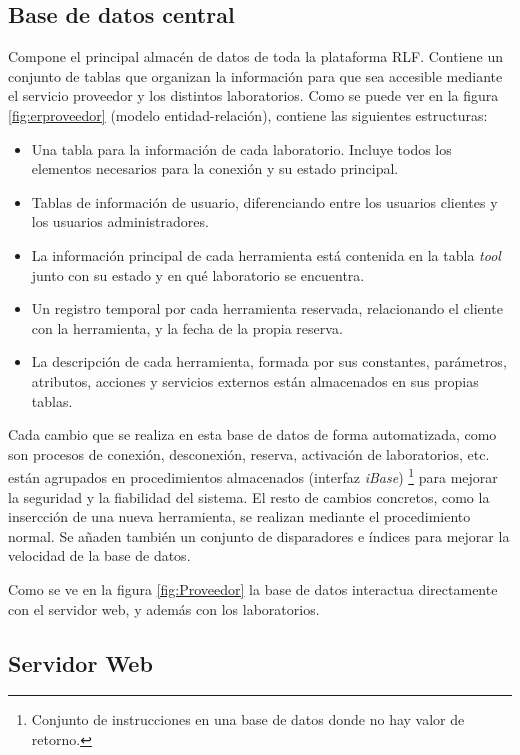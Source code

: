 
\subsection{Base de datos central}

Compone el principal almacén de datos de toda la plataforma RLF. 
Contiene un conjunto de tablas que organizan la información para que 
sea accesible mediante el servicio proveedor y los distintos 
laboratorios. Como se puede ver en la figura \ref{fig:erproveedor} 
(modelo entidad-relación), contiene las siguientes estructuras:

\begin{itemize}
\item Una tabla para la información de cada laboratorio. Incluye todos los 
elementos necesarios para la conexión y su estado principal.
\item Tablas de información de usuario, diferenciando entre los 
usuarios clientes y los usuarios administradores.
\item La información principal de cada herramienta está contenida en 
la tabla \emph{tool} junto con su estado y en qué laboratorio se 
encuentra.
\item Un registro temporal por cada herramienta reservada, 
relacionando el cliente con la herramienta, y la fecha de la propia 
reserva.
\item La descripción de cada herramienta, formada por sus constantes, 
parámetros, atributos, acciones y servicios externos están 
almacenados en sus propias tablas.
\end{itemize}

Cada cambio que se realiza en esta base de datos de forma 
automatizada, como son procesos de conexión, desconexión, reserva, 
activación de laboratorios, etc. están agrupados en procedimientos 
almacenados (interfaz \emph{iBase}) \footnote{Conjunto de 
instrucciones en una base de datos donde no hay valor de retorno.} 
para mejorar la seguridad y la fiabilidad del sistema. El resto de 
cambios concretos, como la insercción de una nueva herramienta, se 
realizan mediante el procedimiento normal. Se añaden también un 
conjunto de disparadores e índices para mejorar la velocidad de la 
base de datos.

Como se ve en la figura \ref{fig:Proveedor} la base de datos 
interactua directamente con el servidor web, y además con los 
laboratorios.

\subsection{Servidor Web}

